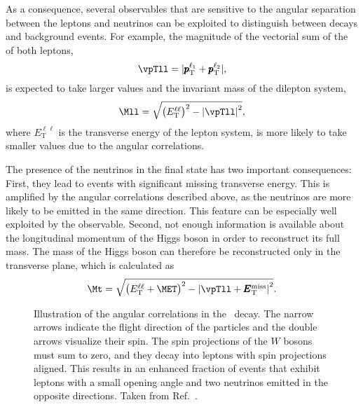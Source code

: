As a consequence, several observables that are sensitive to the angular separation between the leptons and neutrinos can be exploited to distinguish between \HWWdet decays and background events. 
For example, the magnitude of the vectorial sum of the \pT of both leptons,
\begin{equation}
    \vpTll = |\pmb{p}_\text{T}^{\ell_1} + \pmb{p}_\text{T}^{\ell_2}|,
\end{equation}
is expected to take larger values and the invariant mass of the dilepton system,
\begin{equation}
    \Mll = \sqrt{\left( E_{\mathrm{T}}^{\ell\ell} \right)^2 - \left| \vpTll \right|^2},
\end{equation}
where $E_{\mathrm{T}}^{\ell\ell}$ is the transverse energy of the lepton system, is more likely to take smaller values due to the angular correlations. 

The presence of the neutrinos in the final state has two important consequences:
First, they lead to events with significant missing transverse energy. This is amplified by the angular correlations described above, as the neutrinos are more likely to be emitted in the same direction. This feature can be especially well exploited by the \METSig observable.
Second, not enough information is available about the longitudinal momentum of the Higgs boson in order to reconstruct its full mass. The mass of the Higgs boson can therefore be reconstructed only in the transverse plane, which is calculated as
\begin{equation}
\label{eq:transverse-mass}
  \Mt = \sqrt{ \left( E_{\mathrm{T}}^{\ell\ell}+\MET \right)^2 - \left| \vpTll + \pmb{E}_{\text{T}}^{\text{miss}} \right|^2 }.
\end{equation}

\begin{figure}
    \caption[Angular correlations in the \HWWdet\ decay.]{Illustration of the angular correlations in the \HWWdet\ decay. The narrow arrows indicate the flight direction of the particles and the double arrows visualize their spin. The spin projections of the $W$ bosons must sum to zero, and they decay into leptons with spin projections aligned. This results in an enhanced fraction of events that exhibit leptons with a small opening angle and two neutrinos emitted in the opposite directions. Taken from Ref.~\cite{HIGG-2013-13}.}
    \label{fig:spin-correlations}
\end{figure}

